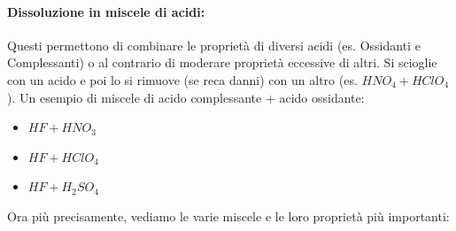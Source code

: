 \documentclass{article}
\begin{document}
\paragraph{Dissoluzione in miscele di acidi:} 
Questi permettono di combinare le proprietà di diversi acidi (es. Ossidanti e Complessanti) o al contrario di moderare proprietà eccessive di altri. Si scioglie con un acido e poi lo si rimuove (se reca danni) con un altro (es. $HNO_4 + HClO_4$).
Un esempio di miscele di acido complessante + acido ossidante:
\begin{itemize}
	\item $HF + HNO_3$
	\item $HF + HClO_4$
	\item $HF + H_2SO_4$
\end{itemize}
%
Ora più precisamente, vediamo le varie miscele e le loro proprietà più importanti:
\end{document}
